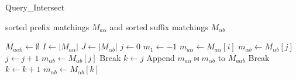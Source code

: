 {\sc Query\_Intersect}

 sorted prefix matchings $M_{a\alpha}$ and sorted suffix matchings $M_{\alpha{}b}$
\begin{algorithmic}[1]

	\State $M_{a\alpha{}b} \leftarrow \emptyset$
	\State $I \leftarrow |M_{a\alpha}|$
	\State $J \leftarrow |M_{\alpha{}b}|$
	\State $j \leftarrow 0$
	\State $m_1 \leftarrow -1$
		\State $m_{a\alpha} \leftarrow M_{a\alpha}[i]$
		\State $m_{\alpha{}b} \leftarrow M_{\alpha{}b}[j]$
				\State $j \leftarrow j + 1$
				\State $m_{\alpha{}b} \leftarrow M_{\alpha{}b}[j]$
			\EndWhile
				\State Break
			\EndIf
		\EndIf
		\State $k \leftarrow j$
				\State Append $m_{a\alpha} \bowtie m_{\alpha{}b}$ to $M_{a\alpha{}b}$
			\EndIf
				\State Break
			\Else
				\State $k \leftarrow k + 1$
				\State $m_{\alpha{}b} \leftarrow M_{\alpha{}b}[k]$
			\EndIf
		\EndWhile
	\EndFor
	\State {}
\end{algorithmic}
